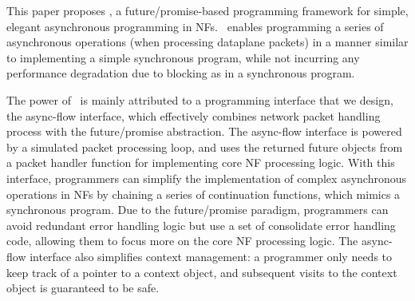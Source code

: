 This paper proposes \netstar, a future/promise-based programming framework for simple, elegant asynchronous programming in NFs. %
\netstar~enables programming a series of asynchronous operations (when processing dataplane packets) in a manner similar to implementing a simple synchronous program, while not incurring any performance degradation due to blocking as in a synchronous program.


The power of \netstar~is mainly attributed to a programming interface that we design, the async-flow interface, which effectively combines network packet handling process with the future/promise abstraction. The async-flow interface is powered by a simulated packet processing loop, and uses the returned future objects from a packet handler function for implementing core NF processing logic. %
 With this interface, programmers can simplify the implementation of complex asynchronous operations in NFs by chaining a series of continuation functions, which mimics a synchronous program. Due to the future/promise paradigm, programmers can avoid redundant error handling logic but use a set of consolidate error handling code, allowing them to focus more on the core NF processing logic. The async-flow interface also simplifies context management: a programmer only needs to keep track of a pointer to a context object, and subsequent visits to the context object is guaranteed to be safe.





